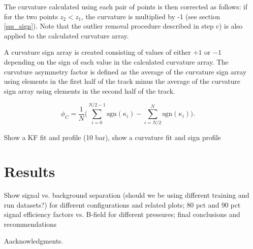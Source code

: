 \documentclass{JINST}
\begin{document}
\noindent The curvature calculated using each pair of points is then corrected as follows: if for the two points $z_2 < z_1$, the curvature is multiplied by -1 (see section \ref{sss_sign}).  Note that the outlier removal procedure described in step c) is also applied to the calculated curvature array.

A curvature sign array is created consisting of values of either $+1$ or $-1$ depending on the sign of each value in the calculated curvature array.  The curvature asymmetry factor is defined as the average of the curvature sign array using elements in the first half of the track minus the average of the curvature sign array using elements in the second half of the track.

\begin{equation}
\phi_{C} = \frac{1}{N}\Biggl(\sum_{i=0}^{N/2-1}\mathrm{sgn}(\kappa_{i}) - \sum_{i=N/2}^{N}\mathrm{sgn}(\kappa_{i})\Biggr).
\end{equation}

Show a KF fit and profile (10 bar), show a curvature fit and sign profile

\section{Results}
Show signal vs. background separation (should we be using different training and run datasets?) for different configurations and related plots; 80 pct and 90 pct signal efficiency factors vs. B-field for different pressures; final conclusions and recommendations

\newpage %




\acknowledgments

Aacknowledgments.


\end{document}

